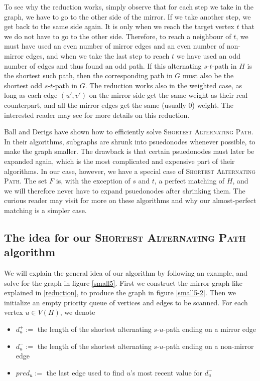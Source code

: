 To see why the reduction works, simply observe that for each step we take in the graph, we have to go to the other side of the mirror. If we take another step, we get back to the same side again. It is only when we reach the target vertex $t$ that we do not have to go to the other side. Therefore, to reach a neighbour of $t$, we must have used an even number of mirror edges and an even number of non-mirror edges, and when we take the last step to reach $t$ we have used an odd number of edges and thus found an odd path. If this alternating $s$-$t$-path in $H$ is the shortest such path, then the corresponding path in $G$ must also be the shortest odd $s$-$t$-path in $G$. The reduction works also in the weighted case, as long as each edge $(u',v')$ on the mirror side get the same weight as their real counterpart, and all the mirror edges get the same (usually 0) weight. The interested reader may see \cite{derigs_shortest_odd_path} for more details on this reduction.

Ball and Derigs \cite{shortest_alternating_path} have shown how to efficiently solve \textsc{Shortest Alternating Path}. In their algorithms, subgraphs are shrunk into psuedonodes whenever possible, to make the graph smaller. The drawback is that certain psuedonodes must later be expanded again, which is the most complicated and expensive part of their algorithms. In our case, however, we have a special case of \textsc{Shortest Alternating Path}. The set $F$ is, with the exception of $s$ and $t$, a perfect matching of $H$, and we will therefore never have to expand psuedonodes after shrinking them. The curious reader may visit \cite{shortest_alternating_path} for more on these algorithms and why our almost-perfect matching is a simpler case.

\subsection{The idea for our \textsc{Shortest Alternating Path} algorithm}
We will explain the general idea of our algorithm by following an example, and solve for the graph in figure \ref{small5}. First we construct the mirror graph like explained in \ref{reduction}, to produce the graph in figure \ref{small5-2}. Then we initialize an empty priority queue of vertices and edges to be scanned. For each vertex $u \in V(H)$, we denote
\begin{itemize}
    \item $d^+_u :=$ the length of the shortest alternating $s$-$u$-path ending on a mirror edge
    \item $d^-_u :=$ the length of the shortest alternating $s$-$u$-path ending on a non-mirror edge
    \item $pred_u :=$ the last edge used to find $u$'s most recent value for $d^-_u$
\end{itemize}


